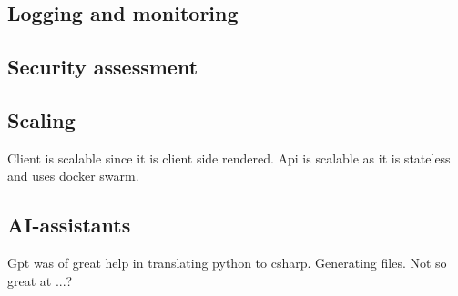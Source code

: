 \subsection{Logging and monitoring}

\subsection{Security assessment}

\subsection{Scaling}

Client is scalable since it is client side rendered.
Api is scalable as it is stateless and uses docker swarm.

\subsection{AI-assistants}

Gpt was of great help in translating python to csharp.
Generating files.
Not so great at ...?